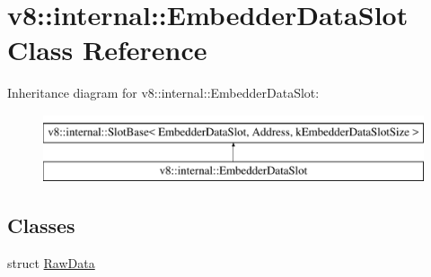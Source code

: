 \hypertarget{classv8_1_1internal_1_1EmbedderDataSlot}{}\section{v8\+:\+:internal\+:\+:Embedder\+Data\+Slot Class Reference}
\label{classv8_1_1internal_1_1EmbedderDataSlot}
Inheritance diagram for v8\+:\+:internal\+:\+:Embedder\+Data\+Slot\+:\begin{figure}[H]
\begin{center}
\leavevmode
\includegraphics[height=2.000000cm]{classv8_1_1internal_1_1EmbedderDataSlot}
\end{center}
\end{figure}
\subsection*{Classes}
\begin{DoxyCompactItemize}
\item 
struct \mbox{\hyperlink{structv8_1_1internal_1_1EmbedderDataSlot_1_1RawData}{Raw\+Data}}
\end{DoxyCompactItemize}
